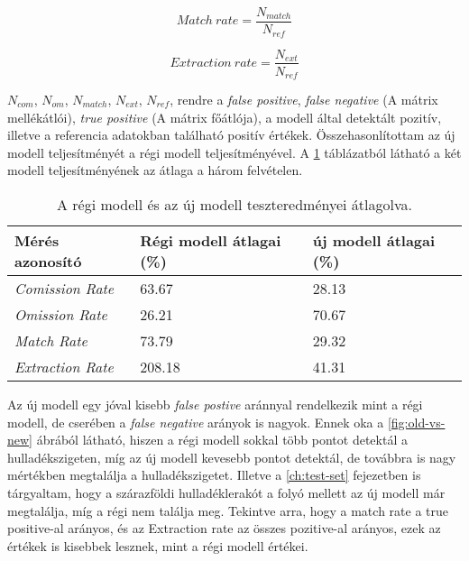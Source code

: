 \begin{equation}\label{eq:match-rate}
    Match \ rate = \frac{N_{match}}{N_{ref}}
\end{equation}

\begin{equation}\label{eq:extraction-rate}
    Extraction \ rate = \frac{N_{ext}}{N_{ref}}
\end{equation}

$N_{com}$, $N_{om}$, $N_{match}$, $N_{ext}$, $N_{ref}$, rendre a \textit{false positive}, \textit{false negative} (A mátrix mellékátlói), \textit{true positive} (A mátrix főátlója), a modell által detektált pozitív, illetve a referencia adatokban található positív értékek. Összehasonlítottam az új modell teljesítményét a régi modell teljesítményével. A \ref{tab:old-vs-new} táblázatból látható a két modell teljesítményének az átlaga a három felvételen.

\begin{table}[H]
	\centering
	\begin{tabular}{ | p{} | p{} | p{} | }
		\hline
		\textbf{Mérés azonosító} & \textbf{Régi modell átlagai (\%)} & \textbf{új modell átlagai (\%)} \\
		\hline \hline
		\emph{Comission Rate} & 63.67 & 28.13 \\
		\hline
		\emph{Omission Rate} & 26.21 & 70.67 \\
		\hline
		\emph{Match Rate} & 73.79 & 29.32 \\
		\hline
        \emph{Extraction Rate} & 208.18 & 41.31 \\
		\hline
	\end{tabular}
	\caption{A régi modell és az új modell teszteredményei átlagolva.}
	\label{tab:old-vs-new}
\end{table}

Az új modell egy jóval kisebb \textit{false postive} aránnyal rendelkezik mint a régi modell, de cserében a \textit{false negative} arányok is nagyok. Ennek oka a \ref{fig:old-vs-new} ábrából látható, hiszen a régi modell sokkal több pontot detektál a hulladékszigeten, míg az új modell kevesebb pontot detektál, de továbbra is nagy mértékben megtalálja a hulladékszigetet. Illetve a \ref{ch:test-set} fejezetben is tárgyaltam, hogy a szárazföldi hulladéklerakót a folyó mellett az új modell már megtalálja, míg a régi nem találja meg. Tekintve arra, hogy a match rate a true positive-al arányos, és az Extraction rate az összes pozitive-al arányos, ezek az értékek is kisebbek lesznek, mint a régi modell értékei.

